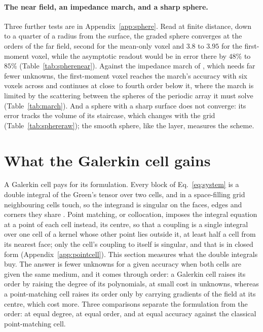 \documentclass[11pt,a4paper]{article}
\begin{document}
\paragraph{The near field, an impedance march, and a sharp sphere.} Three further tests are in
Appendix~\ref{app:sphere}. Read at finite distance, down to a quarter of a radius from the surface, the
graded sphere converges at the orders of the far field, second for the mean-only voxel and $3.8$ to
$3.95$ for the first-moment voxel, while the asymptotic readout would be in error there by $48\%$ to
$85\%$ (Table~\ref{tab:spherenear}). Against the impedance march of \citet{Haines2004}, which needs
far fewer unknowns, the first-moment voxel reaches the march's accuracy with six voxels across and
continues at close to fourth order below it, where the march is limited by the scattering between
the spheres of the periodic array it must solve (Table~\ref{tab:march}). And a sphere with a sharp
surface does not converge: its error tracks the volume of its staircase, which changes with the grid
(Table~\ref{tab:sphereraw}); the smooth sphere, like the layer, measures the scheme.

\FloatBarrier

\section{What the Galerkin cell gains}\label{sec:gain}

A Galerkin cell pays for its formulation. Every block of Eq.~\eqref{eq:system} is a double integral of
the Green's tensor over two cells, and in a space-filling grid neighbouring cells touch, so the
integrand is singular on the faces, edges and corners they share \citep{NestorCoupling2026}. Point
matching, or collocation, imposes the integral equation at a point of each cell instead, its centre, so
that a coupling is a single integral over one cell of a kernel whose other point lies outside it, at
least half a cell from its nearest face; only the cell's coupling to itself is singular, and that is in
closed form (Appendix~\ref{app:pointcell}). This section measures what the double integrals buy.
The answer is fewer unknowns for a given accuracy when both cells are given the same medium, and it comes
through order: a Galerkin cell raises its order by raising the degree of its polynomials, at small cost
in unknowns, whereas a point-matching cell raises its order only by carrying gradients of the field at
its centre, which cost more. Three comparisons separate the formulation from the order: at equal degree,
at equal order, and at equal accuracy against the classical point-matching cell.
\end{document}
